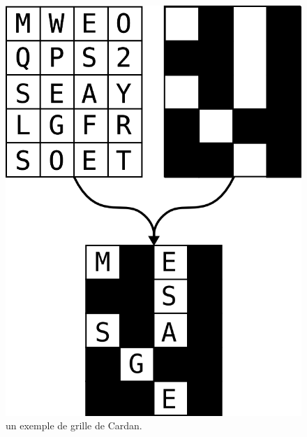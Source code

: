 \begin{figure}
  \begin{center}
    \includegraphics[scale=0.2]{images/GrilleCardan.png}
  \end{center}
  \caption{un exemple de grille de Cardan.}
  \label{fig:GrilleCardan}
  \vspace{-10pt}
\end{figure}


